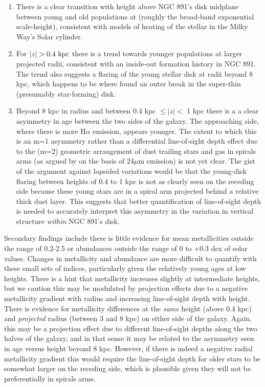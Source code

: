 \begin{enumerate}
  \item There is a clear transition with height above NGC 891's disk
    midplane between young and old populations at 
    (roughly the broad-band exponential scale-height), consistent with
    models of heating of the stellar in the Milky Way's Solar
    cylinder.

  \item For $|z| > 0.4~\mathrm{kpc} $ there is a trend towards younger
    populations at larger projected radii, consistent with an
    inside-out formation history in NGC 891. The trend also suggests a
    flaring of the young stellar disk at radii beyond 8 kpc, which
    happens to be where \citet{Schechtman-Rook13} found an outer break
    in the super-thin (presumably star-forming) disk.

  \item Beyond 8 kpc in radius and between 0.4 kpc $\leq |z| <$ 1 kpc
    there is a a clear asymmetry in age between the two sides of the
    galaxy. The approaching side, where there is more H$\alpha$
    emission, appears younger. The extent to which this is an m=1
    asymmetry rather than a differential line-of-sight depth effect
    due to the (m=2) geometric arrangement of dust trailing stars and
    gas in spirals arms (as argued by \citet{Kamphuis07b} on the basis
    of 24$\mu$m emission) is not yet clear.  The gist of the argument
    against lopsided variations would be that the young-disk flaring
    between heights of 0.4 to 1 kpc is not as clearly seen on the
    receding side because these young stars are in a spiral arm
    projected behind a relative thick dust layer.  This suggests that
    better quantification of line-of-sight depth is needed to
    accurately interpret this asymmetry in the variation in vertical
    structure {\it within} NGC 891's disk.

\end{enumerate}

Secondary findings include there is little evidence for mean
metallicities outside the range of 0.2-2.5 \Zsol or abundances outside
the range of 0 to +0.3 dex of solar values. Changes in metallicity and
abundance are more difficult to quantify with these small sets of
indices, particularly given the relatively young ages at low
heights. There is a hint that metallicity increases slightly at
intermediate heights, but we caution this may be modulated by
projection effects due to a negative metallicity gradient with radius
and increasing line-of-sight depth with height. There is evidence for
metallicity differences at the {\it same} height (above 0.4 kpc) and
{\it projected} radius (between 3 and 8 kpc) on either side of the
galaxy. Again, this may be a projection effect due to different
line-of-sight depths along the two halves of the galaxy, and in that
sense it may be related to the asymmetry seen in age versus height
beyond 8 kpc. However, if there is indeed a negative radial
metallicity gradient this would require the line-of-sight depth for
older stars to be somewhat larger on the receding side, which is
plausible given they will not be preferentially in spirals arms.

